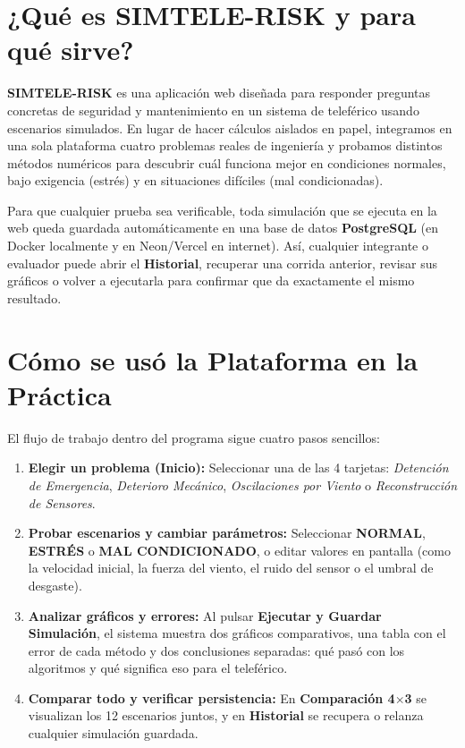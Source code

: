 \documentclass[11pt,a4paper]{article}
\begin{document}
\section{¿Qué es SIMTELE-RISK y para qué sirve?}
\textbf{SIMTELE-RISK} es una aplicación web diseñada para responder preguntas concretas de seguridad y mantenimiento en un sistema de teleférico usando escenarios simulados. En lugar de hacer cálculos aislados en papel, integramos en una sola plataforma cuatro problemas reales de ingeniería y probamos distintos métodos numéricos para descubrir cuál funciona mejor en condiciones normales, bajo exigencia (estrés) y en situaciones difíciles (mal condicionadas).

Para que cualquier prueba sea verificable, toda simulación que se ejecuta en la web queda guardada automáticamente en una base de datos \textbf{PostgreSQL} (en Docker localmente y en Neon/Vercel en internet). Así, cualquier integrante o evaluador puede abrir el \textbf{Historial}, recuperar una corrida anterior, revisar sus gráficos o volver a ejecutarla para confirmar que da exactamente el mismo resultado.

\section{Cómo se usó la Plataforma en la Práctica}
El flujo de trabajo dentro del programa sigue cuatro pasos sencillos:
\begin{enumerate}[noitemsep]
    \item \textbf{Elegir un problema (Inicio):} Seleccionar una de las 4 tarjetas: \textit{Detención de Emergencia}, \textit{Deterioro Mecánico}, \textit{Oscilaciones por Viento} o \textit{Reconstrucción de Sensores}.
    \item \textbf{Probar escenarios y cambiar parámetros:} Seleccionar \textbf{NORMAL}, \textbf{ESTRÉS} o \textbf{MAL CONDICIONADO}, o editar valores en pantalla (como la velocidad inicial, la fuerza del viento, el ruido del sensor o el umbral de desgaste).
    \item \textbf{Analizar gráficos y errores:} Al pulsar \textbf{Ejecutar y Guardar Simulación}, el sistema muestra dos gráficos comparativos, una tabla con el error de cada método y dos conclusiones separadas: qué pasó con los algoritmos y qué significa eso para el teleférico.
    \item \textbf{Comparar todo y verificar persistencia:} En \textbf{Comparación 4$\times$3} se visualizan los 12 escenarios juntos, y en \textbf{Historial} se recupera o relanza cualquier simulación guardada.
\end{enumerate}
\end{document}
